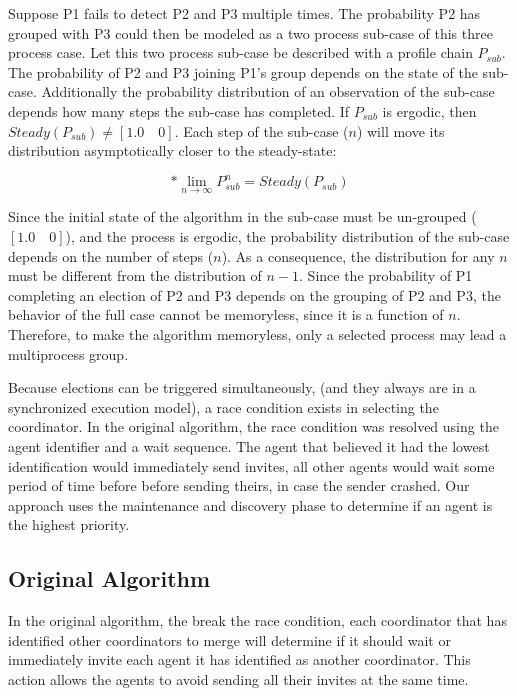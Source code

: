 Suppose P1 fails to detect P2 and P3 multiple times.
The probability P2 has grouped with P3 could then be modeled as a two process sub-case of this three process case.
Let this two process sub-case be described with a profile chain $P_{sub}$.
The probability of P2 and P3 joining P1's group depends on the state of the sub-case.
Additionally the probability distribution of an observation of the sub-case depends how many steps the sub-case has completed.
If $P_{sub}$ is ergodic, then $Steady(P_{sub}{}) \neq [1.0 \quad 0]$.
Each step of the sub-case ($n$) will move its distribution asymptotically closer to the steady-state:

\begin{equation} [1.0 \quad 0] * \lim_{n \to \infty}P_{sub}^n = Steady(P_{sub}) \end{equation}

Since the initial state of the algorithm in the sub-case must be un-grouped ($[1.0 \quad 0]$), and the process is ergodic, the probability distribution of the sub-case depends on the number of steps ($n$).
As a consequence, the distribution for any $n$ must be different from the distribution of $n-1$.
Since the probability of P1 completing an election of P2 and P3 depends on the grouping of P2 and P3, the behavior of the full case cannot be memoryless, since it is a function of $n$.
Therefore, to make the algorithm memoryless, only a selected process may lead a multiprocess group.

Because elections can be triggered simultaneously, (and they always are in a synchronized execution model), a race condition exists in selecting the coordinator. In the original algorithm, the race condition was resolved using the agent identifier and a wait sequence. The agent that believed it had the lowest identification would immediately send invites, all other agents would wait some period of time before before sending theirs, in case the sender crashed. Our approach uses the maintenance and discovery phase to determine if an agent is the highest priority.

\subsection{Original Algorithm}

In the original algorithm, the break the race condition, each coordinator that has identified other coordinators to merge will determine if it should wait or immediately invite each agent it has identified as another coordinator. This action allows the agents to avoid sending all their invites at the same time.

